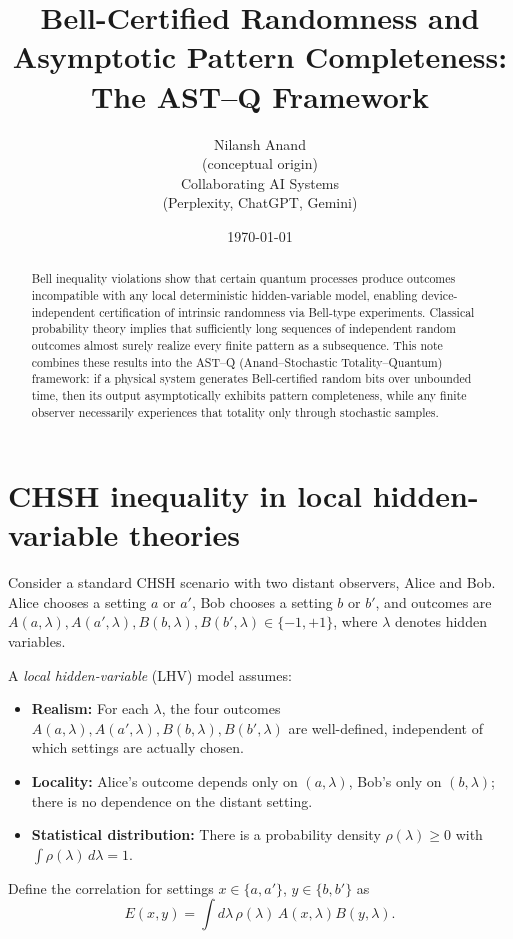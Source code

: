 \documentclass[11pt]{article}
\title{Bell-Certified Randomness and Asymptotic Pattern Completeness: The AST--Q Framework}
\author{Nilansh Anand\\(conceptual origin)\\Collaborating AI Systems\\(Perplexity, ChatGPT, Gemini)}
\date{\today}
\begin{document}
\maketitle

\begin{abstract}
Bell inequality violations show that certain quantum processes produce outcomes incompatible with any local deterministic hidden-variable model, enabling device-independent certification of intrinsic randomness via Bell-type experiments. Classical probability theory implies that sufficiently long sequences of independent random outcomes almost surely realize every finite pattern as a subsequence. This note combines these results into the AST--Q (Anand--Stochastic Totality--Quantum) framework: if a physical system generates Bell-certified random bits over unbounded time, then its output asymptotically exhibits pattern completeness, while any finite observer necessarily experiences that totality only through stochastic samples.
\end{abstract}

\section{CHSH inequality in local hidden-variable theories}

Consider a standard CHSH scenario with two distant observers, Alice and Bob. Alice chooses a setting $a$ or $a'$, Bob chooses a setting $b$ or $b'$, and outcomes are $A(a,\lambda), A(a',\lambda), B(b,\lambda), B(b',\lambda) \in \{-1,+1\}$, where $\lambda$ denotes hidden variables.

A \emph{local hidden-variable} (LHV) model assumes:
\begin{itemize}
  \item \textbf{Realism:} For each $\lambda$, the four outcomes $A(a,\lambda), A(a',\lambda), B(b,\lambda), B(b',\lambda)$ are well-defined, independent of which settings are actually chosen.
  \item \textbf{Locality:} Alice's outcome depends only on $(a,\lambda)$, Bob's only on $(b,\lambda)$; there is no dependence on the distant setting.
  \item \textbf{Statistical distribution:} There is a probability density $\rho(\lambda) \ge 0$ with $\int \rho(\lambda)\,d\lambda = 1$.
\end{itemize}

Define the correlation for settings $x \in \{a,a'\}$, $y \in \{b,b'\}$ as
\begin{equation}
E(x,y) = \int d\lambda\, \rho(\lambda)\, A(x,\lambda) B(y,\lambda).
\end{equation}
\end{document}
